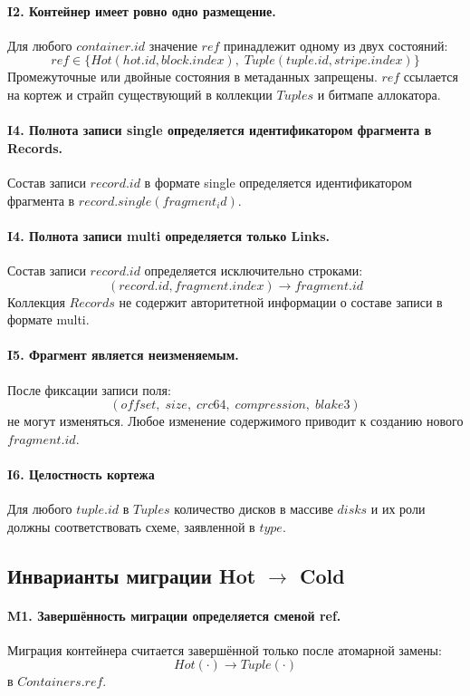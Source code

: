 \documentclass[a4paper,12pt]{article}
\begin{document}
\paragraph{I2. Контейнер имеет ровно одно размещение.}
Для любого $container.id$ значение $ref$ принадлежит одному из двух состояний:
\[
ref \in \{ Hot(hot.id, block.index),\; Tuple(tuple.id, stripe.index) \}
\]
Промежуточные или двойные состояния в метаданных запрещены. $ref$ ссылается на кортеж и страйп
существующий в коллекции $Tuples$ и битмапе аллокатора.

\paragraph{I4. Полнота записи single определяется идентификатором фрагмента в Records.}
Состав записи $record.id$ в формате single определяется идентификатором фрагмента в $record.single(fragment_id)$.

\paragraph{I4. Полнота записи multi определяется только Links.}
Состав записи $record.id$ определяется исключительно строками:
\[
(record.id, fragment.index) \rightarrow fragment.id
\]
Коллекция $Records$ не содержит авторитетной информации о составе записи в формате multi.

\paragraph{I5. Фрагмент является неизменяемым.}
После фиксации записи поля:
\[
(offset,\; size,\; crc64,\; compression,\; blake3)
\]
не могут изменяться. Любое изменение содержимого приводит к созданию нового
$fragment.id$.

\paragraph{I6. Целостность кортежа}
Для любого $tuple.id$ в $Tuples$ количество дисков в массиве $disks$ и их роли должны соответствовать схеме, заявленной в $type$.

\subsection{Инварианты миграции Hot $\rightarrow$ Cold}

\paragraph{M1. Завершённость миграции определяется сменой ref.}
Миграция контейнера считается завершённой только после атомарной замены:
\[
Hot(\cdot) \rightarrow Tuple(\cdot)
\]
в $Containers.ref$.
\end{document}
